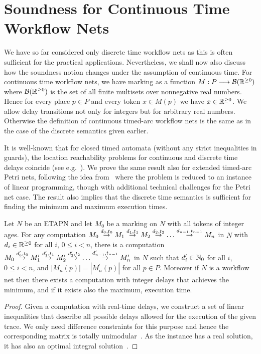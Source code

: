 \section{Soundness for Continuous Time Workflow Nets} \label{sec:cont}

We have so far considered only discrete time workflow nets as this
is often sufficient for the practical applications. Nevertheless,
we shall now also discuss how the soundness
notion changes under the assumption of continuous time. 
For continuous time workflow nets,
we have marking as a function $M : P \longrightarrow \mathcal{B}(\mathbb{R}^{\geq 0})$ 
where $\mathcal{B}(\mathbb{R}^{\geq 0})$ is the set of all finite multisets over
nonnegative real numbers. Hence for every place $p \in P$ and 
every token $x \in M(p)$ we have $x \in \mathbb{R}^{\geq 0}$. We allow delay
transitions not only for integers but for arbitrary real numbers.
Otherwise the definition of continuous timed-arc workflow nets
is the same as in the case of the discrete semantics given earlier.

It is well-known that for closed 
timed automata (without any strict inequalities in guards), 
the location reachability problems for continuous and
discrete time delays coincide (see e.g.~\cite{AMP:CONCUR:98,danny_VLiet}).
We prove the same result also for extended timed-arc Petri
nets, following the idea from~\cite{danny_VLiet} where
the problem is reduced to an instance of 
linear programming, though with additional technical challenges 
for the Petri net case.
The result also implies that
the discrete time semantics is sufficient for finding the minimum
and maximum execution times.

\begin{theorem}\label{thm:discvscont}
Let $N$ be an ETAPN and let $M_0$ be a marking on $N$ with all tokens
of integer ages. For any computation 
$M_0 \stackrel{d_0,t_0}{\rightarrow} M_1 \stackrel{d_1,t_1}{\rightarrow} M_2 \stackrel{d_2,t_2}{\rightarrow} 
\ldots \stackrel{d_{n-1},t_{n-1}}{\rightarrow} M_{n}$ in $N$ 
with $d_i \in \mathbb{R}^{\geq 0}$ for all $i$, $0 \leq i < n$, there is a computation 
$M_0 \stackrel{d^\prime_0,t_0}{\rightarrow} M^\prime_1 \stackrel{d^\prime_1,t_1}{\rightarrow} M^\prime_2 \stackrel{d^\prime_2,t_2}{\rightarrow} 
\ldots \stackrel{d^\prime_{n-1},t_{n-1}}{\rightarrow} M^\prime_{n}$ in $N$ such that
$d^\prime_i \in \mathbb{N}_{0}$ for all $i$, $0 \leq i < n$, and
$|M_n(p)|=|M^\prime_n(p)|$ for all $p \in P$.
Moreover if $N$ is a workflow net then there exists a computation with 
integer delays that achieves
the minimum, and if it exists also the maximum, execution time. 
\end{theorem}
\begin{proof}
Given a computation with real-time delays, we construct a set of linear
inequalities that describe all possible delays allowed for the execution
of the given trace. We only need difference constraints
for this purpose and hence the corresponding matrix 
is totally unimodular~\cite{umodmatrix1}. As the instance 
has a real solution, it has also an optimal integral 
solution~\cite{umodmatrix2}. 
\end{proof}

